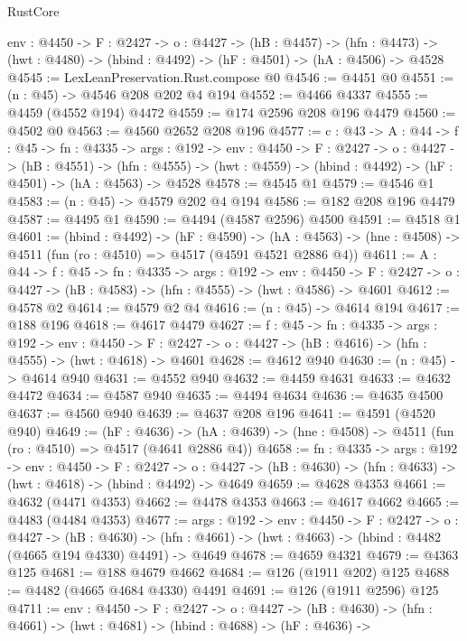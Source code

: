 \begin{lexlean}{RustCore}
\begin{coremodule}
  {env : @4450} ->
  {F : @2427} ->
  {o : @4427} ->
  (hB : @4457) ->
  (hfn : @4473) -> (hwt : @4480) -> (hbind : @4492) -> (hF : @4501) -> (hA : @4506) -> @4528
@4545 := LexLeanPreservation.Rust.compose @0
@4546 := @4451 @0
@4551 := (n : @45) -> @4546 @208 @202 @4 @194
@4552 := @4466 @4337
@4555 := @4459 (@4552 @194) @4472
@4559 := @174 @2596 @208 @196 @4479
@4560 := @4502 @0
@4563 := @4560 @2652 @208 @196
@4577 := {c : @43} ->
  {A : @44} ->
  {f : @45} ->
  {fn : @4335} ->
  {args : @192} ->
  {env : @4450} ->
  {F : @2427} ->
  {o : @4427} ->
  (hB : @4551) ->
  (hfn : @4555) -> (hwt : @4559) -> (hbind : @4492) -> (hF : @4501) -> (hA : @4563) -> @4528
@4578 := @4545 @1
@4579 := @4546 @1
@4583 := (n : @45) -> @4579 @202 @4 @194
@4586 := @182 @208 @196 @4479
@4587 := @4495 @1
@4590 := @4494 (@4587 @2596) @4500
@4591 := @4518 @1
@4601 := (hbind : @4492) ->
  (hF : @4590) ->
  (hA : @4563) -> (hne : @4508) -> @4511 (fun (ro : @4510) => @4517 (@4591 @4521 @2886 @4))
@4611 := {A : @44} ->
  {f : @45} ->
  {fn : @4335} ->
  {args : @192} ->
  {env : @4450} ->
  {F : @2427} -> {o : @4427} -> (hB : @4583) -> (hfn : @4555) -> (hwt : @4586) -> @4601
@4612 := @4578 @2
@4614 := @4579 @2 @4
@4616 := (n : @45) -> @4614 @194
@4617 := @188 @196
@4618 := @4617 @4479
@4627 := {f : @45} ->
  {fn : @4335} ->
  {args : @192} ->
  {env : @4450} ->
  {F : @2427} -> {o : @4427} -> (hB : @4616) -> (hfn : @4555) -> (hwt : @4618) -> @4601
@4628 := @4612 @940
@4630 := (n : @45) -> @4614 @940
@4631 := @4552 @940
@4632 := @4459 @4631
@4633 := @4632 @4472
@4634 := @4587 @940
@4635 := @4494 @4634
@4636 := @4635 @4500
@4637 := @4560 @940
@4639 := @4637 @208 @196
@4641 := @4591 (@4520 @940)
@4649 := (hF : @4636) ->
  (hA : @4639) -> (hne : @4508) -> @4511 (fun (ro : @4510) => @4517 (@4641 @2886 @4))
@4658 := {fn : @4335} ->
  {args : @192} ->
  {env : @4450} ->
  {F : @2427} ->
  {o : @4427} -> (hB : @4630) -> (hfn : @4633) -> (hwt : @4618) -> (hbind : @4492) -> @4649
@4659 := @4628 @4353
@4661 := @4632 (@4471 @4353)
@4662 := @4478 @4353
@4663 := @4617 @4662
@4665 := @4483 (@4484 @4353)
@4677 := {args : @192} ->
  {env : @4450} ->
  {F : @2427} ->
  {o : @4427} ->
  (hB : @4630) ->
  (hfn : @4661) -> (hwt : @4663) -> (hbind : @4482 (@4665 @194 @4330) @4491) -> @4649
@4678 := @4659 @4321
@4679 := @4363 @125
@4681 := @188 @4679 @4662
@4684 := @126 (@1911 @202) @125
@4688 := @4482 (@4665 @4684 @4330) @4491
@4691 := @126 (@1911 @2596) @125
@4711 := {env : @4450} ->
  {F : @2427} ->
  {o : @4427} ->
  (hB : @4630) ->
  (hfn : @4661) ->
  (hwt : @4681) ->
  (hbind : @4688) ->
  (hF : @4636) ->

\end{coremodule}
\end{lexlean}
